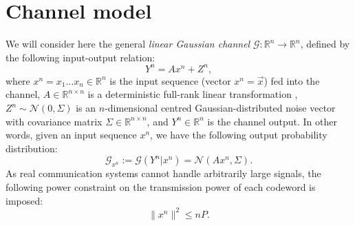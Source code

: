 \documentclass[10pt,conference]{IEEEtran}
\newcommand{\1}{\mathds{1}}
\newcommand{\RR}{\mathbb{R}}
\newcommand{\cG}{\mathcal{G}}
\newcommand{\cN}{\mathcal{N}}
\newcommand{\aw}[1]{{\color{blue}#1}}
\newcommand{\pau}[1]{{\color{purple}#1}}
\begin{document}
\medskip

\section{Channel model}
\label{sec:channel}
We will consider here the general \emph{linear Gaussian channel} $\cG:\RR^n\rightarrow \RR^n$, defined by the following input-output relation:
\begin{equation}\label{eq:input-output}
Y^n=A x^n+Z^n,
\end{equation}
where $x^n=x_1\dots x_n\in \RR^n$ is the input sequence (vector $x^n=\vec{x}$) fed into the channel, 
$A \in \RR^{n \times n}$ is a deterministic full-rank linear transformation ,
$Z^n \sim \cN(0, \Sigma)$ is an $n$-dimensional centred Gaussian-distributed noise vector with covariance matrix $\Sigma \in \RR^{n \times n}$, 
and $Y^n \in \RR^n$ is the channel output.
In other words, given an input sequence $x^n$, we have the following output probability distribution:
\begin{equation}
  \label{eq:outputPD}
  \cG_{x^n}:=\cG(Y^n|x^n)=\cN(Ax^n,\Sigma).
\end{equation}
As real communication systems cannot handle arbitrarily large signals, the following power constraint on the transmission power of each codeword is imposed:
\begin{equation}
  \label{eq:power_constraint}
  \|x^n\|^2\leq nP.
\end{equation}

\end{document}
